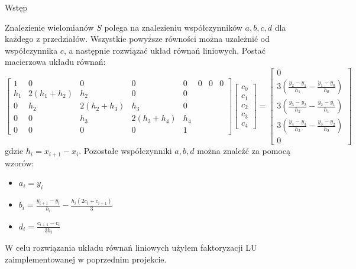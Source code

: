 \documentclass{article}
\begin{document}
\begin{section}{Wstęp}
\begin{itemize}
  \end{itemize}\cite{wyklad5}
  Znalezienie wielomianów $S$ polega na znalezieniu współczynników $a, b, c, d$ dla każdego z przedziałów.
  Wszystkie powyższe równości można uzależnić od współczynnika $c$, a następnie rozwiązać układ równań liniowych.
  Postać macierzowa układu równań:
  \begin{equation}
    \begin{bmatrix}
      1 & 0 & 0 & 0 & 0 & 0 & 0 & 0 \\
      h_{1} & 2(h_{1} + h_{2}) & h_{2} & 0 & 0 \\
      0 & h_{2} & 2(h_{2} + h_{3}) & h_{3} & 0 \\
      0 & 0 & h_{3} & 2(h_{3} + h_{4}) & h_{4} \\
      0 & 0 & 0 & 0 & 1
    \end{bmatrix}
    \begin{bmatrix}
      c_{0} \\
      c_{1} \\
      c_{2} \\
      c_{3} \\
      c_{4}
    \end{bmatrix}
    =
    \begin{bmatrix}
      0 \\
      3(\frac{y_{2} - y_{1}}{h_{1}} - \frac{y_{1} - y_{0}}{h_{0}}) \\
      3(\frac{y_{3} - y_{2}}{h_{2}} - \frac{y_{2} - y_{1}}{h_{1}}) \\
      3(\frac{y_{4} - y_{3}}{h_{3}} - \frac{y_{3} - y_{2}}{h_{2}}) \\
      0
    \end{bmatrix}
  \end{equation}
  gdzie $h_{i} = x_{i+1} - x_{i}$.
  Pozostałe współczynniki $a, b, d$ można znaleźć za pomocą wzorów:
  \begin{itemize}
    \item $a_{i} = y_{i}$
    \item $b_{i} = \frac{y_{i+1} - y_{i}}{h_{i}} - \frac{h_{i}(2c_{i} + c_{i+1})}{3}$
    \item $d_{i} = \frac{c_{i+1} - c_{i}}{3h_{i}}$
  \end{itemize}
  W celu rozwiązania układu równań liniowych użyłem faktoryzacji LU zaimplementowanej w poprzednim projekcie.
\end{section}
\end{document}
